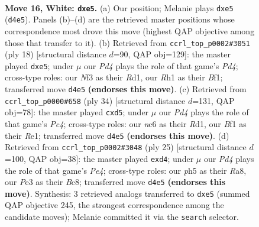 \documentclass[11pt]{article}
\begin{document}
\clearpage

\begin{figure}[p]\centering
\begin{subfigure}{0.46\textwidth}\centering
\resizebox{\linewidth}{!}{%
\newchessgame
\chessboard[
  setfen={1rbr2k1/p1p1qpp1/2n2n2/2Ppp2p/1p1P4/1Q2PNP1/PP1B1P1P/2K1RB1R w - - 0 16},
  showmover=false,
  pgfstyle=straightmove, color=movearrow, markmove={d4-e5}
]}
\caption{}
\end{subfigure}\hfill
\begin{subfigure}{0.46\textwidth}\centering
\resizebox{\linewidth}{!}{%
\newchessgame
\chessboard[
  setfen={2kr1b1r/pppq1pp1/2n2n2/3pp2p/3P4/1PN1PQ1P/PBP2PP1/2KR1B1R w - - 0 10},
  showmover=false,
  pgfstyle=straightmove, color=movearrow, markmove={d4-e5}
]}
\caption{}
\end{subfigure}
\\[4pt]
\begin{subfigure}{0.46\textwidth}\centering
\resizebox{\linewidth}{!}{%
\newchessgame
\chessboard[
  setfen={3rr1k1/1p1q1pp1/2n2nbp/p1ppp3/2P5/PP1PPN1P/1BQ2PP1/3RRBK1 w - - 0 18},
  showmover=false,
  pgfstyle=straightmove, color=movearrow, markmove={c4-d5}
]}
\caption{}
\end{subfigure}\hfill
\begin{subfigure}{0.46\textwidth}\centering
\resizebox{\linewidth}{!}{%
\newchessgame
\chessboard[
  setfen={r1bq2k1/1pp1br1p/p1p2pp1/2n1p3/P2PP3/2N1BN2/1PP2PPP/R2Q1RK1 b - - 0 13},
  showmover=false,
  pgfstyle=straightmove, color=movearrow, markmove={e5-d4}
]}
\caption{}
\end{subfigure}
\caption{\textbf{Move 16, White: \texttt{dxe5}.} (a) Our position; Melanie plays \texttt{dxe5} (\texttt{d4e5}). Panels (b)--(d) are the retrieved master positions whose correspondence most drove this move (highest QAP objective among those that transfer to it). (b) Retrieved from \texttt{ccrl\_top\_p0002\#3051} (ply 18) [structural distance $d$=90, QAP obj=129]: the master played \texttt{dxe5}; under $\mu$ our \emph{Pd4} plays the role of that game's \emph{Pd4}; cross-type roles: our \emph{N}f3 as their \emph{R}d1, our \emph{R}h1 as their \emph{B}f1; transferred move \texttt{d4e5} \textbf{(endorses this move)}. (c) Retrieved from \texttt{ccrl\_top\_p0000\#658} (ply 34) [structural distance $d$=131, QAP obj=78]: the master played \texttt{cxd5}; under $\mu$ our \emph{Pd4} plays the role of that game's \emph{Pc4}; cross-type roles: our \emph{n}c6 as their \emph{R}d1, our \emph{B}f1 as their \emph{R}e1; transferred move \texttt{d4e5} \textbf{(endorses this move)}. (d) Retrieved from \texttt{ccrl\_top\_p0002\#3048} (ply 25) [structural distance $d$=100, QAP obj=38]: the master played \texttt{exd4}; under $\mu$ our \emph{Pd4} plays the role of that game's \emph{Pe4}; cross-type roles: our \emph{p}h5 as their \emph{R}a8, our \emph{P}e3 as their \emph{B}c8; transferred move \texttt{d4e5} \textbf{(endorses this move)}. Synthesis: 3 retrieved analogs transferred to \texttt{dxe5} (summed QAP objective 245, the strongest correspondence among the candidate moves); Melanie committed it via the \texttt{search} selector.}
\label{fig:thought-m30}
\end{figure}
\end{document}
